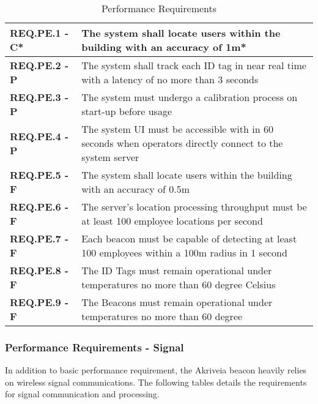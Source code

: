 \bigskip
\bgroup
\def\arraystretch{1.5}
\begin{table}[H]
\centering
\begin{tabular}{ | m{3.5cm} | m{12.5cm} |} 
 \hline
 \textbf{REQ.PE.1 - C*} & The system shall locate users within the building with an accuracy of 1m* \\ 
\hline
 \textbf{REQ.PE.2 - P} & The system shall track each ID tag in near real time with a latency of no more than 3 seconds \\ 
\hline
 \textbf{REQ.PE.3 - P} & The system must undergo a calibration process on start-up before usage \\ 
\hline
 \textbf{REQ.PE.4 - P} & The system UI must be accessible with in 60 seconds when operators directly connect to the system server \\
\hline
 \textbf{REQ.PE.5 - F} & The system shall locate users within the building with an accuracy of 0.5m \\
\hline
 \textbf{REQ.PE.6 - F} & The server's location processing throughput must be at least 100 employee locations per second \\
\hline
 \textbf{REQ.PE.7 - F} & Each beacon must be capable of detecting at least 100 employees within a 100m radius in 1 second \\
\hline
 \textbf{REQ.PE.8 - F} & The ID Tags must remain operational under temperatures no more than 60 degree Celsius \\
\hline
 \textbf{REQ.PE.9 - F} & The Beacons must remain operational under temperatures no more than 60 degree  \\
\hline
\end{tabular}
\caption{Performance Requirements}
\end{table}	

\break

\subsubsection{Performance Requirements - Signal}
\bigskip
In addition to basic performance requirement, the Akriveia beacon heavily relies on wireless signal communications. The following tables details the requirements for signal communication and processing.
\bigskip

